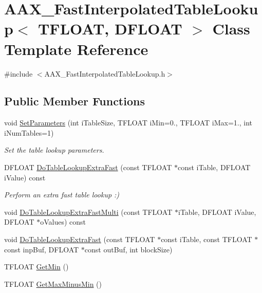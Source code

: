 \hypertarget{a01977}{}\section{A\+A\+X\+\_\+\+Fast\+Interpolated\+Table\+Lookup$<$ T\+F\+L\+O\+AT, D\+F\+L\+O\+AT $>$ Class Template Reference}
\label{a01977}


{\ttfamily \#include $<$A\+A\+X\+\_\+\+Fast\+Interpolated\+Table\+Lookup.\+h$>$}

\subsection*{Public Member Functions}
\begin{DoxyCompactItemize}
\item 
void \mbox{\hyperlink{a01977_a74f25a087c55a337d8cdff14c73df7cb}{Set\+Parameters}} (int i\+Table\+Size, T\+F\+L\+O\+AT i\+Min=0., T\+F\+L\+O\+AT i\+Max=1., int i\+Num\+Tables=1)
\begin{DoxyCompactList}\small\item\em Set the table lookup parameters. \end{DoxyCompactList}\item 
D\+F\+L\+O\+AT \mbox{\hyperlink{a01977_aaad992e09c837d96ad715092fbefd91d}{Do\+Table\+Lookup\+Extra\+Fast}} (const T\+F\+L\+O\+AT $\ast$const i\+Table, D\+F\+L\+O\+AT i\+Value) const
\begin{DoxyCompactList}\small\item\em Perform an extra fast table lookup \+:) \end{DoxyCompactList}\item 
void \mbox{\hyperlink{a01977_a60e89d13066ca0606c8f71cf5313f0e3}{Do\+Table\+Lookup\+Extra\+Fast\+Multi}} (const T\+F\+L\+O\+AT $\ast$i\+Table, D\+F\+L\+O\+AT i\+Value, D\+F\+L\+O\+AT $\ast$o\+Values) const
\item 
void \mbox{\hyperlink{a01977_a11b9680510916ee500ced08d3da3fcb2}{Do\+Table\+Lookup\+Extra\+Fast}} (const T\+F\+L\+O\+AT $\ast$const i\+Table, const T\+F\+L\+O\+AT $\ast$const inp\+Buf, D\+F\+L\+O\+AT $\ast$const out\+Buf, int block\+Size)
\item 
T\+F\+L\+O\+AT \mbox{\hyperlink{a01977_aabf15d98a86ea76bccbb0eab444bfab5}{Get\+Min}} ()
\item 
T\+F\+L\+O\+AT \mbox{\hyperlink{a01977_a7824f358e11c2ee1637f631230a8d967}{Get\+Max\+Minus\+Min}} ()
\end{DoxyCompactItemize}


